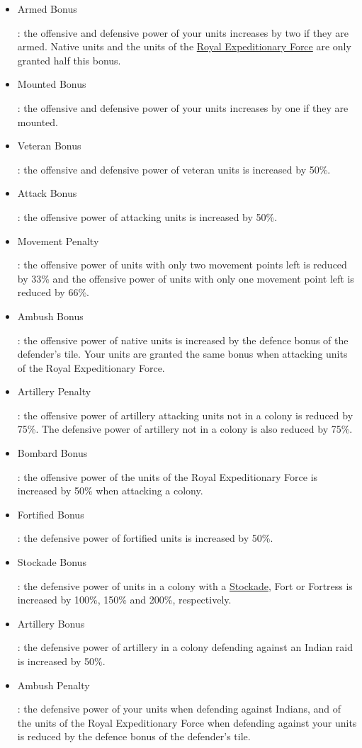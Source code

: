 \documentclass[12pt]{article}
\begin{document}
\begin{itemize}
\item \hypertarget{Armed Bonus}{Armed Bonus}: the offensive and
  defensive power of your units increases by two if they are
  armed. Native units and the units of the \hyperlink{Royal
    Expeditionary Force}{Royal Expeditionary Force} are only granted
  half this bonus.
\item \hypertarget{Mounted Bonus}{Mounted Bonus}: the offensive and
  defensive power of your units increases by one if they are mounted.
\item \hypertarget{Veteran Bonus}{Veteran Bonus}: the offensive and
  defensive power of veteran units is increased by 50\%.
\item \hypertarget{Attack Bonus}{Attack Bonus}: the offensive power of
  attacking units is increased by 50\%.
\item \hypertarget{Movement Penalty}{Movement Penalty}: the offensive
  power of units with only two movement points left is reduced by 33\%
  and the offensive power of units with only one movement point left
  is reduced by 66\%.
\item \hypertarget{Ambush Bonus}{Ambush Bonus}: the offensive power of
  native units is increased by the defence bonus of the defender's
  tile. Your units are granted the same bonus when attacking units of
  the Royal Expeditionary Force.
\item \hypertarget{Artillery Penalty}{Artillery Penalty}: the
  offensive power of artillery attacking units not in a colony is
  reduced by 75\%. The defensive power of artillery not in a colony is
  also reduced by 75\%.
\item \hypertarget{Bombard Bonus}{Bombard Bonus}: the offensive power
  of the units of the Royal Expeditionary Force is increased by 50\%
  when attacking a colony.
\item \hypertarget{Fortified Bonus}{Fortified Bonus}: the defensive
  power of fortified units is increased by 50\%.
\item \hypertarget{Stockade Bonus}{Stockade Bonus}: the defensive
  power of units in a colony with a \hyperlink{Stockade}{Stockade},
  Fort or Fortress is increased by 100\%, 150\% and 200\%,
  respectively.
\item \hypertarget{Artillery Bonus}{Artillery Bonus}: the defensive
  power of artillery in a colony defending against an Indian raid is
  increased by 50\%.
\item \hypertarget{Ambush Penalty}{Ambush Penalty}: the defensive
  power of your units when defending against Indians, and of the units
  of the Royal Expeditionary Force when defending against your units
  is reduced by the defence bonus of the defender's tile.
\end{itemize}
\end{document}
